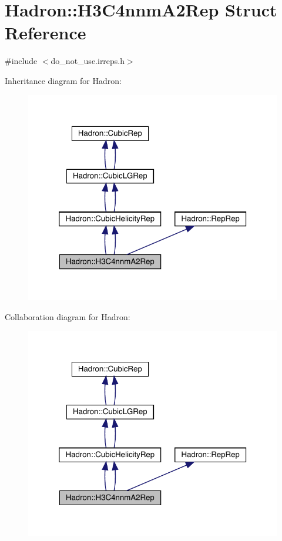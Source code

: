 \hypertarget{structHadron_1_1H3C4nnmA2Rep}{}\section{Hadron\+:\+:H3\+C4nnm\+A2\+Rep Struct Reference}
\label{structHadron_1_1H3C4nnmA2Rep}


{\ttfamily \#include $<$do\+\_\+not\+\_\+use.\+irreps.\+h$>$}



Inheritance diagram for Hadron\+:\nopagebreak
\begin{figure}[H]
\begin{center}
\leavevmode
\includegraphics[width=320pt]{d0/dd0/structHadron_1_1H3C4nnmA2Rep__inherit__graph}
\end{center}
\end{figure}


Collaboration diagram for Hadron\+:\nopagebreak
\begin{figure}[H]
\begin{center}
\leavevmode
\includegraphics[width=320pt]{d0/df5/structHadron_1_1H3C4nnmA2Rep__coll__graph}
\end{center}
\end{figure}
